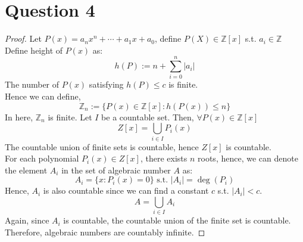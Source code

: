 \documentclass{article}
\begin{document}
\section*{Question 4}
\begin{proof}
    Let $P(x) = a_nx^n + \cdots + a_1x + a_0$, define $P(X) \in \mathbb{Z}[x]$ s.t. $a_i \in \mathbb{Z}$
    \\
    Define height of $P(x)$ as:
    \[ h(P) := n + \sum_{i = 0}^{n} |a_i| \]
    The number of $P(x)$ satisfying $h(P) \leq c$ is finite.
    \\
    Hence we can define,
    \[ \mathbb{Z}_n := \{ P(x) \in \mathbb{Z}[x]: h(P(x)) \leq n \} \]
    In here, $\mathbb{Z}_n$ is finite. Let $I$ be a countable set. Then, $\forall P(x) \in \mathbb{Z}[x]$
    \[ Z[x] = \bigcup_{i \in I} P_i(x) \]
    The countable union of finite sets is countable, hence $Z[x]$ is countable.
    \\
    For each polynomial $P_i(x) \in Z[x]$, there exists $n$ roots, hence, we can denote the element $A_i$ in the set of algebraic number $A$ as:
    \[ A_i = \{ x: P_i(x) = 0\} \text{ s.t. } |A_i| = \deg(P_i) \]
    Hence, $A_i$ is also countable since we can find a constant $c$ s.t. $|A_i| < c$.
    \[ A = \bigcup_{i \in I} A_i \]
    Again, since $A_i$ is countable, the countable union of the finite set is countable.
    \\
    Therefore, algebraic numbers are countably infinite.
\end{proof}
\end{document}
